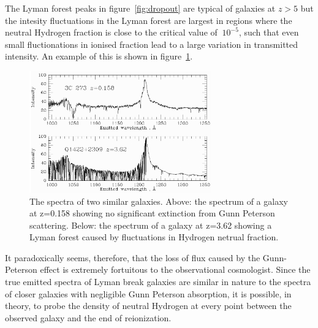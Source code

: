 		The Lyman forest peaks in figure~\ref{fig:dropout} are typical of galaxies at $z>5$ but the intesity fluctuations in the Lyman forest are largest in regions where the neutral Hydrogen fraction is close to the critical value of $~10^{-5}$, such that even small fluctionations in ionised fraction lead to a large variation in transmitted intensity. An example of this is shown in figure~\ref{fig:forest}.
		\begin{figure}[htbp]
			\centering
			\includegraphics[width=0.7\textwidth]{../Images/forest.png}
			\caption{The spectra of two similar galaxies. Above: the spectrum of a galaxy at z=0.158 showing no significant extinction from Gunn Peterson scattering. Below: the spectrum of a galaxy at z=3.62 showing a Lyman forest caused by fluctuations in Hydrogen netrual fraction.}
			\label{fig:forest}
		\end{figure}

		It paradoxically seems, therefore, that the loss of flux caused by the Gunn-Peterson effect is extremely fortuitous to the observational cosmologist. Since the true emitted spectra of Lyman break galaxies are similar in nature to the spectra of closer galaxies with negligible Gunn Peterson absorption, it is possible, in theory, to probe the density of neutral Hydrogen at every point between the observed galaxy and the end of reionization.

